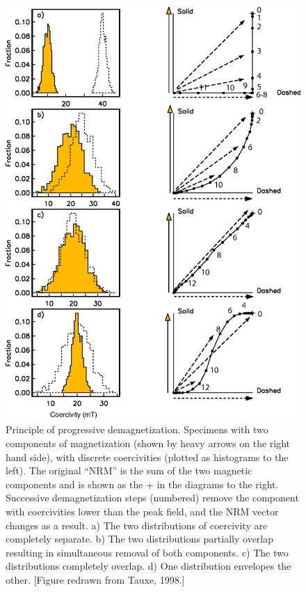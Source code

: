 \begin{figure}[p]
\centering  \includegraphics[width=11 cm]{EPSfiles/comps.eps}
\caption {Principle of progressive demagnetization.
Specimens with two components of magnetization (shown by heavy arrows on
the right hand side), 
with discrete coercivities (plotted as histograms to the left).
The original ``NRM'' is the sum of the two magnetic
 components and is shown as the 
+ in the diagrams to the right.
Successive demagnetization steps (numbered)  remove the component with coercivities
lower than the peak field, 
and the NRM vector changes as a result. a) The two
distributions of coercivity are completely separate.
b) The two distributions partially overlap resulting in simultaneous removal of
both components.  c) The two distributions 
completely overlap.  d) One
distribution envelopes the other.  [Figure redrawn from Tauxe, 1998.]
}
\label{fig:comps}
\end{figure}


